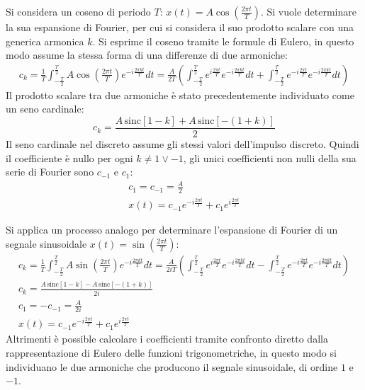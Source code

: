\documentclass{article}
\numberwithin{equation}{subsection}
\begin{document}
Si considera un coseno di periodo $T$: $x(t)=A\cos\left(\frac{2\pi t}{T}\right)$. Si vuole determinare la sua espansione di Fourier, per cui si considera il suo prodotto 
scalare con una generica armonica $k$. Si esprime il coseno tramite le formule di Eulero, in questo modo assume la stessa forma di una differenze di due armoniche: 
\begin{gather*}
    c_k=\displaystyle\frac{1}{T}\int_{-\frac{T}{2}}^{\frac{T}{2}}A\cos\left(\frac{2\pi t}{T}\right)e^{-i\frac{2\pi kt}{T}}dt=
    \frac{A}{2T}\left(\int_{-\frac{T}{2}}^{\frac{T}{2}}e^{i\frac{2\pi t}{T}}e^{-i\frac{2\pi kt}{T}}dt+\int_{-\frac{T}{2}}^{\frac{T}{2}}e^{-i\frac{2\pi t}{T}}e^{-i\frac{2\pi kt}{T}}dt\right)
\end{gather*}
Il prodotto scalare tra due armoniche è stato precedentemente individuato come un seno cardinale:
\begin{equation*}
    \displaystyle c_k=\frac{A\,\mbox{sinc}[1-k]+A\,\mbox{sinc}[-(1+k)]}{2}
\end{equation*}
Il seno cardinale nel discreto assume gli stessi valori dell'impulso discreto. 
Quindi il coefficiente è nullo per ogni $k\neq1\lor-1$, gli unici coefficienti non nulli della sua serie di Fourier sono $c_{-1}$ e $c_1$:
\begin{gather*}
    \displaystyle c_1=c_{-1}=\frac{A}{2}\\
    \displaystyle x(t)=c_{-1}e^{-i\frac{2\pi t}{T}}+c_1e^{i\frac{2\pi t}{T}}
\end{gather*}


Si applica un processo analogo per determinare l'espansione di Fourier di un segnale sinusoidale $x(t)=\sin\left(\frac{2\pi t}{T}\right)$:
\begin{gather*}
    c_k=\displaystyle\frac{1}{T}\int_{-\frac{T}{2}}^{\frac{T}{2}}A\sin\left(\frac{2\pi t}{T}\right)e^{-i\frac{2\pi kt}{T}}dt=
    \frac{A}{2iT}\left(\int_{-\frac{T}{2}}^{\frac{T}{2}}e^{i\frac{2\pi t}{T}}e^{-i\frac{2\pi kt}{T}}dt-\int_{-\frac{T}{2}}^{\frac{T}{2}}e^{-i\frac{2\pi t}{T}}e^{-i\frac{2\pi kt}{T}}dt\right)\\
    \displaystyle c_k=\frac{A\,\mbox{sinc}[1-k]-A\,\mbox{sinc}[-(1+k)]}{2i}\\
    c_1=-c_{-1}=\frac{A}{2i}\\
    x(t)=c_{-1}e^{-i\frac{2\pi t}{T}}+c_1e^{i\frac{2\pi t}{T}}
\end{gather*}
Altrimenti è possible calcolare i coefficienti tramite confronto diretto dalla rappresentazione di Eulero delle funzioni trigonometriche, in questo modo si individuano le due 
armoniche che producono il segnale sinusoidale, di ordine $1$ e $-1$. 
\end{document}
